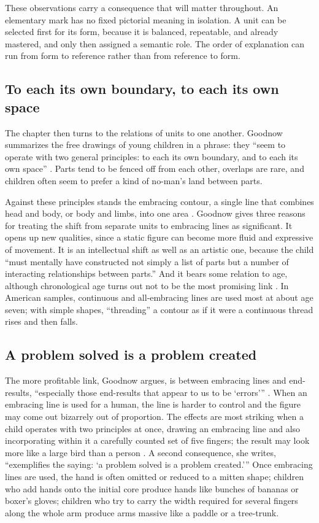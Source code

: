 \documentclass[11pt]{article}
\theoremstyle{remark}
\begin{document}
These observations carry a consequence that will matter throughout. An elementary mark has no fixed pictorial meaning in isolation. A unit can be selected first for its form, because it is balanced, repeatable, and already mastered, and only then assigned a semantic role. The order of explanation can run from form to reference rather than from reference to form.

\subsection{To each its own boundary, to each its own space}

The chapter then turns to the relations of units to one another. Goodnow summarizes the free drawings of young children in a phrase: they ``seem to operate with two general principles: to each its own boundary, and to each its own space'' \cite[p.~44]{goodnow1977}. Parts tend to be fenced off from each other, overlaps are rare, and children often seem to prefer a kind of no-man's land between parts.

Against these principles stands the embracing contour, a single line that combines head and body, or body and limbs, into one area \cite[pp.~44--45]{goodnow1977}. Goodnow gives three reasons for treating the shift from separate units to embracing lines as significant. It opens up new qualities, since a static figure can become more fluid and expressive of movement. It is an intellectual shift as well as an artistic one, because the child ``must mentally have constructed not simply a list of parts but a number of interacting relationships between parts.'' And it bears some relation to age, although chronological age turns out not to be the most promising link \cite[pp.~45--46]{goodnow1977}. In American samples, continuous and all-embracing lines are used most at about age seven; with simple shapes, ``threading'' a contour as if it were a continuous thread rises and then falls.

\subsection{A problem solved is a problem created}

The more profitable link, Goodnow argues, is between embracing lines and end-results, ``especially those end-results that appear to us to be `errors''' \cite[p.~47]{goodnow1977}. When an embracing line is used for a human, the line is harder to control and the figure may come out bizarrely out of proportion. The effects are most striking when a child operates with two principles at once, drawing an embracing line and also incorporating within it a carefully counted set of five fingers; the result may look more like a large bird than a person \cite[p.~48]{goodnow1977}. A second consequence, she writes, ``exemplifies the saying: `a problem solved is a problem created.''' Once embracing lines are used, the hand is often omitted or reduced to a mitten shape; children who add hands onto the initial core produce hands like bunches of bananas or boxer's gloves; children who try to carry the width required for several fingers along the whole arm produce arms massive like a paddle or a tree-trunk.
\end{document}
